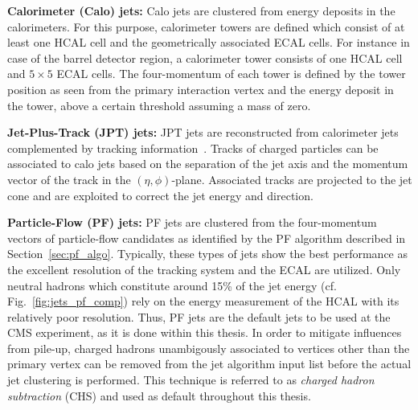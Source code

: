 \begin{description}
 \item \textbf{Calorimeter (Calo) jets:} Calo jets are clustered from energy deposits in the calorimeters. For this purpose, calorimeter towers are defined which consist of at least one HCAL cell and the geometrically associated ECAL cells. For instance in case of the barrel detector region, a calorimeter tower consists of one HCAL cell and $\mathrm{5 \times 5}$ ECAL cells. The four-momentum of each tower is defined by the tower position as seen from the primary interaction vertex and the energy deposit in the tower, above a certain threshold assuming a mass of zero. 
 \item \textbf{Jet-Plus-Track (JPT) jets:} JPT jets are reconstructed from calorimeter jets complemented by tracking information~\cite{CMS-PAS-JME-09-002}. Tracks of charged particles can be associated to calo jets based on the separation of the jet axis and the momentum vector of the track in the $(\eta,\phi)$-plane. Associated tracks are projected to the jet cone and are exploited to correct the jet energy and direction. 
 \item \textbf{Particle-Flow (PF) jets:} PF jets are clustered from the four-momentum vectors of particle-flow candidates as identified by the PF algorithm described in Section~\ref{sec:pf_algo}. Typically, these types of jets show the best performance as the excellent resolution of the tracking system and the ECAL are utilized. Only neutral hadrons which constitute around 15\% of the jet energy (cf. Fig.~\ref{fig:jets_pf_comp}) rely on the energy measurement of the HCAL with its relatively poor resolution. Thus, PF jets are the default jets to be used at the CMS experiment, as it is done within this thesis. In order to mitigate influences from pile-up, charged hadrons unambigously associated to vertices other than the primary vertex can be removed from the jet algorithm input list before the actual jet clustering is performed. This technique is referred to as \textit{charged hadron subtraction} (CHS) and used as default throughout this thesis. 
\end{description}

